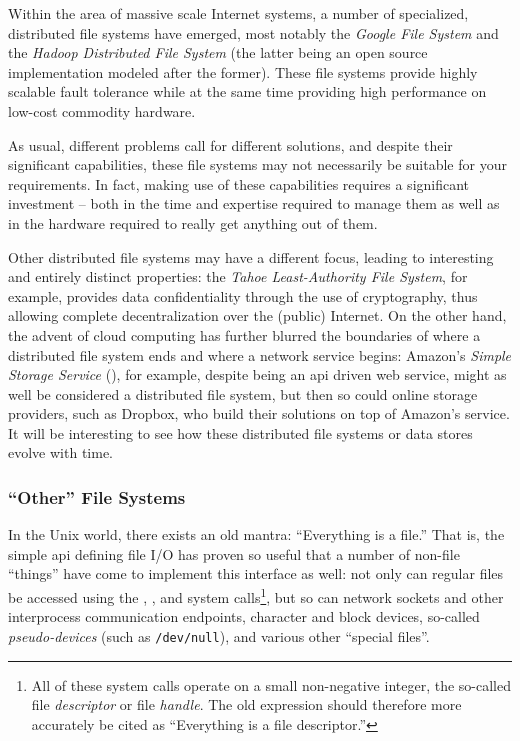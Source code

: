 Within the area of massive scale Internet systems, a
number of specialized, distributed file systems have
emerged, most notably the {\em Google File
System}\cite{filesystems:gfs} and the {\em Hadoop Distributed
File System}\cite{filesystems:hdfs} (the latter being an open source
implementation modeled after the former).  These file
systems provide highly scalable fault tolerance while
at the same time providing high performance on
low-cost commodity hardware.

As usual, different problems call for different
solutions, and despite their significant capabilities,
these file systems may not necessarily be suitable for
your requirements.  In fact, making use of these
capabilities requires a significant investment -- both
in the time and expertise required to manage them as
well as in the hardware required to really get
anything out of them.

Other distributed file systems may have a different
focus, leading to interesting and entirely distinct
properties: the {\em Tahoe Least-Authority File
System}\cite{filesystems:tahoe-lafs}, for example, provides
data confidentiality through the use of cryptography,
thus allowing complete decentralization over the
(public) Internet.  On the other hand, the advent of
cloud computing has further blurred the boundaries of
where a distributed file system ends and where a
network service begins: Amazon's {\em Simple Storage
Service} (), for
example, despite being an \gls{api} driven web
service, might as well be considered a distributed
file system, but then so could online storage
providers, such as Dropbox, who build their
solutions on top of Amazon's service.  It will be
interesting to see how these distributed file systems
or data stores evolve with time.


\subsubsection{``Other'' File Systems}

In the Unix world, there exists an old mantra:
``Everything is a file.'' That is, the simple
\gls{api} defining file I/O has proven so useful that
a number of non-file ``things'' have come to implement
this interface as well: not only can regular files be
accessed using the ,
,  and
 system calls\footnote{All of these
system calls operate on a small non-negative integer,
the so-called file {\em descriptor} or file {\em
handle}.  The old expression should therefore more
accurately be cited as ``Everything is a file
descriptor.''}, but so can network sockets and other
interprocess communication endpoints, character and
block devices, so-called {\em pseudo-devices} (such as
{\tt /dev/null}), and various
other ``special files''.

